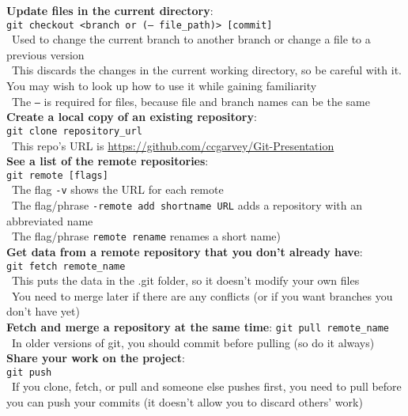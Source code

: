 \documentclass[12pt]{article}
\begin{document}
{{\bf Update files in the current directory}:\\
\texttt{git checkout <branch or (-- file{\_}path)> [commit]}\\
\textbullet\, Used to change the current branch to another branch or change a file to a previous version\\
\textbullet\, This discards the changes in the current working directory, so be careful with it. You may wish to look up how to use it while gaining familiarity\\
\textbullet\, The \texttt{--} is required for files, because file and branch names can be the same\\
    
{\bf Create a local copy of an existing repository}:\\
\texttt{git clone repository{\_}url}\\
\textbullet\, This repo's URL is \url{https://github.com/ccgarvey/Git-Presentation}\\

{\bf See a list of the remote repositories}:\\
\texttt{git remote [flags]}\\
\textbullet\, The flag \texttt{-v} shows the URL for each remote\\
\textbullet\, The flag/phrase \texttt{-remote add shortname URL} adds a repository with an abbreviated name\\
\textbullet\, The flag/phrase \texttt{remote rename} renames a short name)\\

{\bf Get data from a remote repository that you don't already have}:\\
\texttt{git fetch remote{\_}name}\\
\textbullet\, This puts the data in the .git folder, so it doesn't modify your own files\\
\textbullet\, You need to merge later if there are any conflicts (or if you want branches you don't have yet)\\
    
{\bf Fetch and merge a repository at the same time}:
\texttt{git pull remote{\_}name}\\
\textbullet\, In older versions of git, you should commit before pulling (so do it always)\\

{\bf Share your work on the project}:\\
\texttt{git push}\\
\textbullet\, If you clone, fetch, or pull and someone else pushes first, you need to pull before you can push your commits (it doesn't allow you to discard others' work)\\

}
\end{document}
